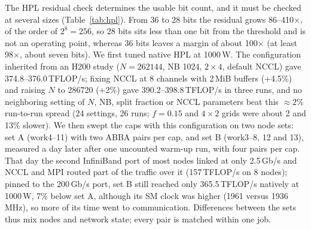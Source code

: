 \documentclass[conference]{IEEEtran}
\newcommand{\W}{\,W}
\newcommand{\pct}{\%}
\begin{document}
The HPL residual check determines the usable bit count, and it must be checked at several sizes
(Table~\ref{tab:hpl}). From 36 to 28 bits the residual grows 86--410$\times$, of the order of $2^8=256$, so 28 bits
sits less than one bit from the threshold and is not an operating point, whereas 36 bits leaves a margin of about
100$\times$ (at least 98$\times$, about seven bits). We first tuned native HPL at 1000\W. The configuration inherited from an H200 study ($N=262144$, NB 1024,
$2\times4$, default NCCL) gave 374.8--376.0\,TFLOP/s; fixing NCCL at 8 channels with 2\,MiB buffers (+4.5\pct) and
raising $N$ to 286720 (+2\pct) gave 390.2--398.8\,TFLOP/s in three runs, and no neighboring setting of $N$, NB, split
fraction or NCCL parameters beat this ${\approx}2\pct$ run-to-run spread (24 settings, 26 runs; $f=0.15$ and
$4\times2$ grids were about 2 and 13\pct{} slower). We then swept the caps with this configuration on two node sets: set
A (work4--11) with two ABBA pairs per cap, and set B (work3--8, 12 and 13), measured a day later after one uncounted
warm-up run, with four pairs per cap. That day the second InfiniBand port of most nodes linked at only 2.5\,Gb/s and
NCCL and MPI routed part of the traffic over it (157\,TFLOP/s on 8 nodes); pinned to the 200\,Gb/s port, set B still
reached only 365.5\,TFLOP/s natively at 1000\W, 7\pct{} below set A, although its SM clock was higher (1961 versus
1936\,MHz), so more of its time went to communication. Differences between the sets thus mix nodes and network state; every
pair is matched within one job.
\end{document}
